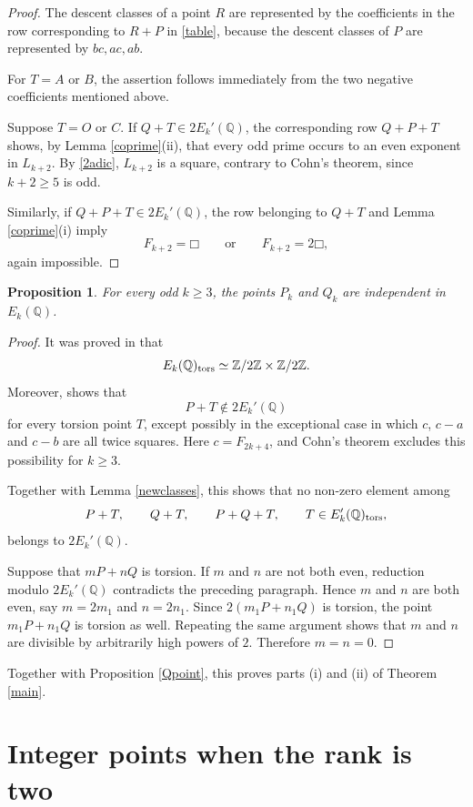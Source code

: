 \documentclass[11pt]{amsart}
\newtheorem{proposition}[theorem]{Proposition}
\theoremstyle{remark}
\newcommand{\Q}{\mathbb{Q}}
\newcommand{\Z}{\mathbb{Z}}
\newcommand{\sq}{\mathord{\Box}}
\begin{document}
\begin{proof}
The descent classes of a point $R$ are represented by the coefficients
in the row corresponding to $R+P$ in \eqref{table}, because the descent classes of
$P$ are represented by $bc,ac,ab$.

For $T=A$ or $B$, the assertion follows immediately from the two
negative coefficients mentioned above.

Suppose $T=O$ or $C$.  If $Q+T\in2E_k'(\Q)$, the corresponding row
$Q+P+T$ shows, by Lemma \ref{coprime}(ii), that every odd prime occurs
to an even exponent in $L_{k+2}$.  By \eqref{2adic}, $L_{k+2}$ is a
square, contrary to Cohn's theorem, since $k+2\geq5$ is odd.

Similarly, if $Q+P+T\in2E_k'(\Q)$, the row belonging to $Q+T$ and
Lemma \ref{coprime}(i) imply
\[
 F_{k+2}=\sq\qquad\text{or}\qquad F_{k+2}=2\sq,
\]
again impossible.
\end{proof}

\begin{proposition}\label{independent}
For every odd $k\geq3$, the points $P_k$ and $Q_k$ are independent in
$E_k(\Q)$.
\end{proposition}

\begin{proof}
It was proved in \cite{DujellaMT} that
\[
 E_k(\Q)_{\rm tors}\simeq\Z/2\Z\times\Z/2\Z.
\]
Moreover, \cite[Lemma 2]{DujellaMT} shows that
\[
 P+T\notin2E_k'(\Q)
\]
for every torsion point $T$, except possibly in the exceptional
case in which $c$, $c-a$ and $c-b$ are all twice squares.
Here $c=F_{2k+4}$, and Cohn's theorem excludes this possibility for
$k\geq3$.

Together with Lemma \ref{newclasses}, this shows that no non-zero element
among
\[
 P+T,\qquad Q+T,\qquad P+Q+T,\qquad T\in E_k'(\Q)_{\rm tors},
\]
belongs to $2E_k'(\Q)$.

Suppose that $mP+nQ$ is torsion.  If $m$ and $n$ are not both even,
reduction modulo $2E_k'(\Q)$ contradicts the preceding paragraph.
Hence $m$ and $n$ are both even, say $m=2m_1$ and $n=2n_1$.
Since $2(m_1P+n_1Q)$ is torsion, the point $m_1P+n_1Q$ is torsion as
well.  Repeating the same argument shows that $m$ and $n$ are divisible
by arbitrarily high powers of $2$.  Therefore $m=n=0$.
\end{proof}

Together with Proposition \ref{Qpoint},
this proves parts (i) and (ii) of Theorem \ref{main}.

\section{Integer points when the rank is two}
\end{document}
